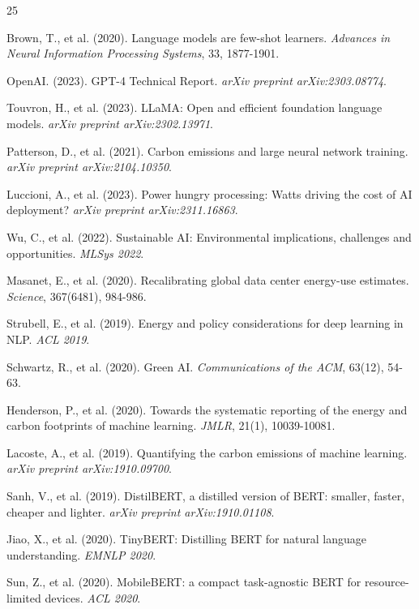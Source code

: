 \documentclass[conference]{IEEEtran}
\begin{document}
\begin{thebibliography}{25}

Brown, T., et al. (2020). Language models are few-shot learners. \textit{Advances in Neural Information Processing Systems}, 33, 1877-1901.

OpenAI. (2023). GPT-4 Technical Report. \textit{arXiv preprint arXiv:2303.08774}.

Touvron, H., et al. (2023). LLaMA: Open and efficient foundation language models. \textit{arXiv preprint arXiv:2302.13971}.

Patterson, D., et al. (2021). Carbon emissions and large neural network training. \textit{arXiv preprint arXiv:2104.10350}.

Luccioni, A., et al. (2023). Power hungry processing: Watts driving the cost of AI deployment? \textit{arXiv preprint arXiv:2311.16863}.

Wu, C., et al. (2022). Sustainable AI: Environmental implications, challenges and opportunities. \textit{MLSys 2022}.

Masanet, E., et al. (2020). Recalibrating global data center energy-use estimates. \textit{Science}, 367(6481), 984-986.

Strubell, E., et al. (2019). Energy and policy considerations for deep learning in NLP. \textit{ACL 2019}.

Schwartz, R., et al. (2020). Green AI. \textit{Communications of the ACM}, 63(12), 54-63.

Henderson, P., et al. (2020). Towards the systematic reporting of the energy and carbon footprints of machine learning. \textit{JMLR}, 21(1), 10039-10081.

Lacoste, A., et al. (2019). Quantifying the carbon emissions of machine learning. \textit{arXiv preprint arXiv:1910.09700}.

Sanh, V., et al. (2019). DistilBERT, a distilled version of BERT: smaller, faster, cheaper and lighter. \textit{arXiv preprint arXiv:1910.01108}.

Jiao, X., et al. (2020). TinyBERT: Distilling BERT for natural language understanding. \textit{EMNLP 2020}.

Sun, Z., et al. (2020). MobileBERT: a compact task-agnostic BERT for resource-limited devices. \textit{ACL 2020}.


\end{thebibliography}
\end{document}
